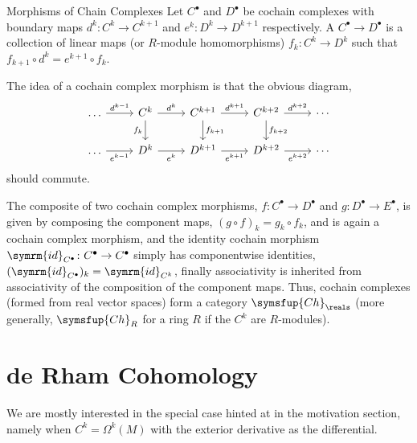 \documentclass[fleqn]{NotesClass}
\makeatletter
\newcommand{\id}{\symrm{id}}
\newcommand{\c@egory}{\symsfup}
\newcommand{\Ch}[1][R]{\c@egory{Ch}_{#1}}
\makeatother
\begin{document}
    \begin{dfn}{Morphisms of Chain Complexes}{}
        Let \(C^{\bullet}\) and \(D^{\bullet}\) be cochain complexes with boundary maps \(d^k \colon C^k \to C^{k+1}\) and \(e^k \colon D^k \to D^{k+1}\) respectively.
        A  \(C^{\bullet} \to D^{\bullet}\) is a collection of linear maps (or \(R\)-module homomorphisms) \(f_k \colon C^k \to D^k\) such that \(f_{k+1} \circ d^k = e^{k + 1} \circ f_k\).
    \end{dfn}
    
    The idea of a cochain complex morphism is that the obvious diagram,
    \begin{equation}
        \begin{tikzcd}
            \dots \arrow[r, "d^{k-1}"] & C^{k} \arrow[r, "d^k"] \arrow[d, "f_k"'] & C^{k+1} \arrow[r, "d^{k+1}"] \arrow[d, "f_{k+1}"] & C^{k+2} \arrow[r, "d^{k+2}"] \arrow[d, "f_{k+2}"] & \dotsb\\
            \dots \arrow[r, "e^{k-1}"'] & D^{k} \arrow[r, "e^k"'] & D^{k+1} \arrow[r, "e^{k+1}"'] & D^{k+2} \arrow[r, "e^{k+2}"'] & \dotsb
        \end{tikzcd}
    \end{equation}
    should commute.
    
    The composite of two cochain complex morphisms, \(f \colon C^{\bullet} \to D^{\bullet}\) and \(g \colon D^{\bullet} \to E^{\bullet}\), is given by composing the component maps, \((g \circ f)_k = g_k \circ f_k\), and is again a cochain complex morphism, and the identity cochain morphism \(\id_{C^{\bullet}} \colon C^{\bullet} \to C^{\bullet}\) simply has componentwise identities, \((\id_{C^{\bullet}})_k = \id_{C^k}\), finally associativity is inherited from associativity of the composition of the component maps.
    Thus, cochain complexes (formed from real vector spaces) form a category \(\Ch[\reals]\) (more generally, \(\Ch[R]\) for a ring \(R\) if the \(C^k\) are \(R\)-modules).
    
    \section{de Rham Cohomology}
    We are mostly interested in the special case hinted at in the motivation section, namely when \(C^k = \Omega^k(M)\) with the exterior derivative as the differential.
    
\end{document}
